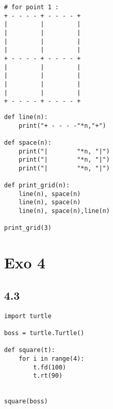 
\begin{verbatim}
# for point 1 : 
+ - - - - + - - - - +
|         |         |
|         |         |
|         |         |
|         |         |
+ - - - - + - - - - +
|         |         |
|         |         |
|         |         |
|         |         |
+ - - - - + - - - - +
\end{verbatim}

\sol
\begin{verbatim}
def line(n):
    print("+ - - - -"*n,"+")

def space(n):
    print("|        "*n, "|")
    print("|        "*n, "|")
    print("|        "*n, "|")

def print_grid(n):
    line(n), space(n)
    line(n), space(n)
    line(n), space(n),line(n)
    
print_grid(3)
\end{verbatim}


\section*{Exo 4}
\subsection*{4.3}
\sol 
\begin{verbatim}
import turtle 

boss = turtle.Turtle()

def square(t):
    for i in range(4):
        t.fd(100)
        t.rt(90)
        
        
square(boss)
\end{verbatim}

